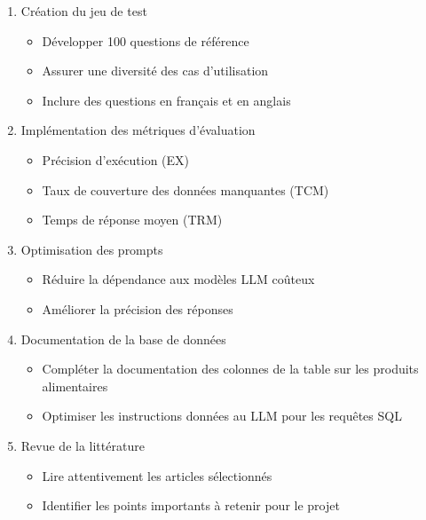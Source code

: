 \documentclass[12pt]{article}
\begin{document}
\begin{enumerate}
    \item Création du jeu de test
        \begin{itemize}
            \item Développer 100 questions de référence
            \item Assurer une diversité des cas d'utilisation
            \item Inclure des questions en français et en anglais
        \end{itemize}
    
    \item Implémentation des métriques d'évaluation
        \begin{itemize}
            \item Précision d'exécution (EX)
            \item Taux de couverture des données manquantes (TCM)
            \item Temps de réponse moyen (TRM)
        \end{itemize}
    
    \item Optimisation des prompts
        \begin{itemize}
            \item Réduire la dépendance aux modèles LLM coûteux
            \item Améliorer la précision des réponses
        \end{itemize}
    
    \item Documentation de la base de données
        \begin{itemize}
            \item Compléter la documentation des colonnes de la table sur les produits alimentaires
            \item Optimiser les instructions données au LLM pour les requêtes SQL
        \end{itemize}

    \item Revue de la littérature
        \begin{itemize}
            \item Lire attentivement les articles sélectionnés
            \item Identifier les points importants à retenir pour le projet
        \end{itemize}
\end{enumerate}
\end{document}
